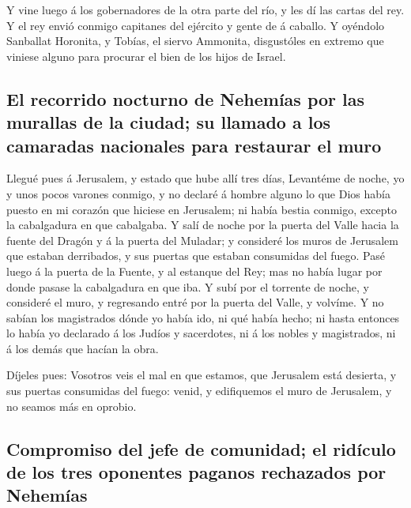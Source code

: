  Y vine luego á los gobernadores de la otra parte del río, y
les dí las cartas del rey. Y el rey envió conmigo capitanes del ejército
y gente de á caballo.  Y oyéndolo Sanballat Horonita, y
Tobías, el siervo Ammonita, disgustóles en extremo que viniese alguno
para procurar el bien de los hijos de Israel.

\hypertarget{el-recorrido-nocturno-de-nehemuxedas-por-las-murallas-de-la-ciudad-su-llamado-a-los-camaradas-nacionales-para-restaurar-el-muro}{%
\subsection{El recorrido nocturno de Nehemías por las murallas de la
ciudad; su llamado a los camaradas nacionales para restaurar el
muro}\label{el-recorrido-nocturno-de-nehemuxedas-por-las-murallas-de-la-ciudad-su-llamado-a-los-camaradas-nacionales-para-restaurar-el-muro}}

 Llegué pues á Jerusalem, y estado que hube allí tres días,
 Levantéme de noche, yo y unos pocos varones conmigo, y no
declaré á hombre alguno lo que Dios había puesto en mi corazón que
hiciese en Jerusalem; ni había bestia conmigo, excepto la cabalgadura en
que cabalgaba.  Y salí de noche por la puerta del Valle
hacia la fuente del Dragón y á la puerta del Muladar; y consideré los
muros de Jerusalem que estaban derribados, y sus puertas que estaban
consumidas del fuego.  Pasé luego á la puerta de la Fuente,
y al estanque del Rey; mas no había lugar por donde pasase la
cabalgadura en que iba.  Y subí por el torrente de noche, y
consideré el muro, y regresando entré por la puerta del Valle, y
volvíme.  Y no sabían los magistrados dónde yo había ido,
ni qué había hecho; ni hasta entonces lo había yo declarado á los Judíos
y sacerdotes, ni á los nobles y magistrados, ni á los demás que hacían
la obra.

 Díjeles pues: Vosotros veis el mal en que estamos, que
Jerusalem está desierta, y sus puertas consumidas del fuego: venid, y
edifiquemos el muro de Jerusalem, y no seamos más en oprobio.

\hypertarget{compromiso-del-jefe-de-comunidad-el-riduxedculo-de-los-tres-oponentes-paganos-rechazados-por-nehemuxedas}{%
\subsection{Compromiso del jefe de comunidad; el ridículo de los tres
oponentes paganos rechazados por
Nehemías}\label{compromiso-del-jefe-de-comunidad-el-riduxedculo-de-los-tres-oponentes-paganos-rechazados-por-nehemuxedas}}

